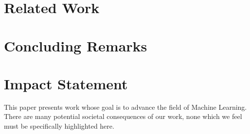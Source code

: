 \documentclass{article}
\begin{document}
\section{Related Work}
\label{sec:related_work}

\section{Concluding Remarks}
\label{sec:conclusion}


\newpage
\section*{Impact Statement}
This paper presents work whose goal is to advance the field
of Machine Learning. There are many potential societal
consequences of our work, none which we feel must be
specifically highlighted here.




\newpage
\appendix
\onecolumn




\label{sec:appendix}



\end{document}
